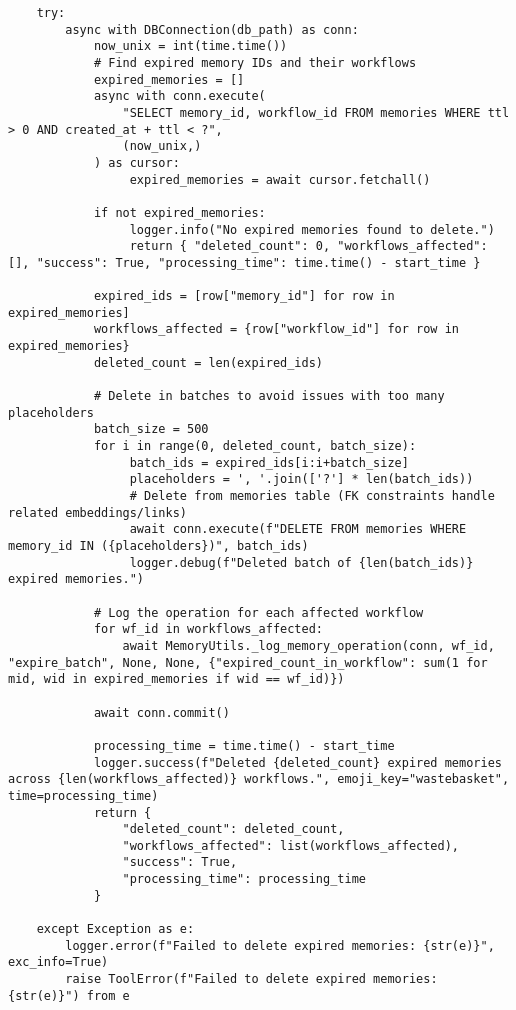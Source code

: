 \documentclass[12pt,a4paper]{article}
\begin{document}
\begin{pageablecode}
\begin{verbatim}
    try:
        async with DBConnection(db_path) as conn:
            now_unix = int(time.time())
            # Find expired memory IDs and their workflows
            expired_memories = []
            async with conn.execute(
                "SELECT memory_id, workflow_id FROM memories WHERE ttl > 0 AND created_at + ttl < ?",
                (now_unix,)
            ) as cursor:
                 expired_memories = await cursor.fetchall()

            if not expired_memories:
                 logger.info("No expired memories found to delete.")
                 return { "deleted_count": 0, "workflows_affected": [], "success": True, "processing_time": time.time() - start_time }

            expired_ids = [row["memory_id"] for row in expired_memories]
            workflows_affected = {row["workflow_id"] for row in expired_memories}
            deleted_count = len(expired_ids)

            # Delete in batches to avoid issues with too many placeholders
            batch_size = 500
            for i in range(0, deleted_count, batch_size):
                 batch_ids = expired_ids[i:i+batch_size]
                 placeholders = ', '.join(['?'] * len(batch_ids))
                 # Delete from memories table (FK constraints handle related embeddings/links)
                 await conn.execute(f"DELETE FROM memories WHERE memory_id IN ({placeholders})", batch_ids)
                 logger.debug(f"Deleted batch of {len(batch_ids)} expired memories.")

            # Log the operation for each affected workflow
            for wf_id in workflows_affected:
                await MemoryUtils._log_memory_operation(conn, wf_id, "expire_batch", None, None, {"expired_count_in_workflow": sum(1 for mid, wid in expired_memories if wid == wf_id)})

            await conn.commit()

            processing_time = time.time() - start_time
            logger.success(f"Deleted {deleted_count} expired memories across {len(workflows_affected)} workflows.", emoji_key="wastebasket", time=processing_time)
            return {
                "deleted_count": deleted_count,
                "workflows_affected": list(workflows_affected),
                "success": True,
                "processing_time": processing_time
            }

    except Exception as e:
        logger.error(f"Failed to delete expired memories: {str(e)}", exc_info=True)
        raise ToolError(f"Failed to delete expired memories: {str(e)}") from e



\end{verbatim}
\end{pageablecode}
\end{document}

